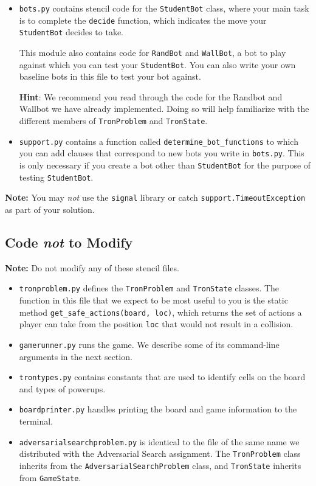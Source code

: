 \documentclass{article}
\begin{document}
\begin{itemize}
\item \texttt{bots.py} contains stencil code for the \texttt{StudentBot} class,
  where your main task is to complete the \texttt{decide} function,
  which indicates the move your \texttt{StudentBot} decides to take.

  This module also contains code for \texttt{RandBot} and \texttt{WallBot}, a bot to play against which you can test your
  \texttt{StudentBot}.  You can also write your own baseline bots in
  this file to test your bot against.
  
  \textbf{Hint}: We recommend you read through the code for the Randbot and Wallbot
  we have already implemented.  Doing so will help familiarize with
  the different members of \texttt{TronProblem} and \texttt{TronState}.

\item \texttt{support.py} contains a function called
  \texttt{determine\_bot\_functions} to which you can add clauses that
  correspond to new bots you write in \texttt{bots.py}.  This is only
  necessary if you create a bot other than \texttt{StudentBot} for the
  purpose of testing \texttt{StudentBot}.
\end{itemize}

\noindent
\textbf{Note:} You may \textit{not\/} use the \texttt{signal} library
or catch \texttt{support.TimeoutException} as part of your solution.


\subsection{Code \emph{not\/} to Modify}
\textbf{Note:} Do not modify any of these stencil files.

\begin{itemize}
\item \texttt{tronproblem.py} defines the \texttt{TronProblem} and \texttt{TronState} classes.
%
  The function in this file that we expect to be most useful to you
  is the static method \texttt{get\_safe\_actions(board, loc)}, which
  returns the set of actions a player can take from the position
  \texttt{loc} that would not result in a collision.

\item \texttt{gamerunner.py} runs the game.  We describe some of its
  command-line arguments in the next section.

\item \texttt{trontypes.py} contains constants that are used to
  identify cells on the board and types of powerups.

\item \texttt{boardprinter.py} handles printing the board and game
  information to the terminal.

\item \texttt{adversarialsearchproblem.py} is identical to the file of
  the same name we distributed with the Adversarial Search assignment.
  The \texttt{TronProblem} class inherits from the
  \texttt{AdversarialSearchProblem} class, and \texttt{TronState}
  inherits from \texttt{GameState}.
\end{itemize}
\end{document}
